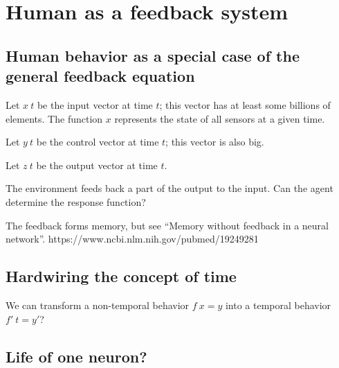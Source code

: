 \chapter{Human as a feedback system}

\section{Human behavior as a special case of the general feedback equation}

Let \(x ~ t\) be the input vector at time \(t\);
this vector has at least some billions of elements.
The function \(x\) represents the state of all sensors at a given time.

Let \(y ~ t\) be the control vector at time \(t\);
this vector is also big.

Let \(z~t\) be the output vector at time \(t\).

The environment feeds back a part of the output to the input.
Can the agent determine the response function?

The feedback forms memory, but see ``Memory without feedback in a neural network''.
https://www.ncbi.nlm.nih.gov/pubmed/19249281

\section{Hardwiring the concept of time}

We can transform a non-temporal behavior \(f~x = y\) into a temporal behavior \(f'~t = y'\)?

\section{Life of one neuron?}

